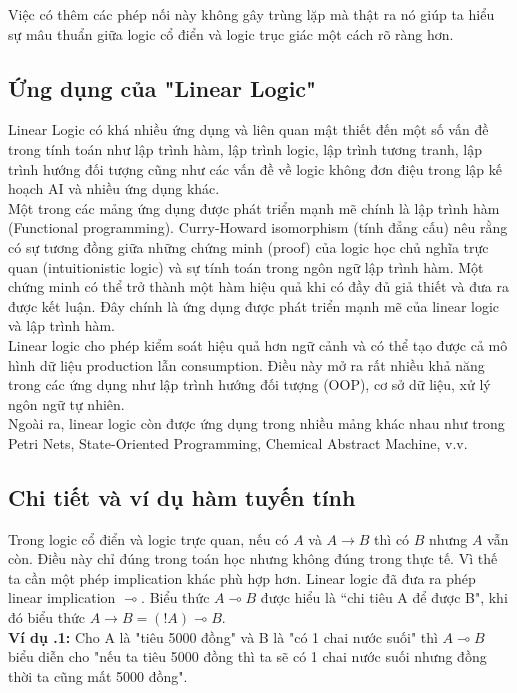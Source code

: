 \documentclass[a4paper]{article}
\begin{document}
Việc có thêm các phép nối này không gây trùng lặp mà thật ra nó giúp ta hiểu sự mâu thuẩn giữa logic cổ điển và logic trục giác một cách rõ ràng hơn.

\subsection{Ứng dụng của "Linear Logic"}
Linear Logic có khá nhiều ứng dụng và liên quan mật thiết đến một số vấn đề trong tính toán như lập trình hàm, lập trình logic, lập trình tương tranh, lập trình hướng đối tượng cũng như các vấn đề về logic không đơn điệu trong lập kế hoạch AI và nhiều ứng dụng khác.\\

Một trong các mảng ứng dụng được phát triển mạnh mẽ chính là lập trình hàm (Functional programming). Curry-Howard isomorphism (tính đẳng cấu) nêu rằng có sự tương đồng giữa những chứng minh (proof) của logic học chủ nghĩa trực quan (intuitionistic logic) và sự tính toán trong ngôn ngữ lập trình hàm. Một chứng minh có thể trở thành một hàm hiệu quả khi có đầy đủ giả thiết và đưa ra được kết luận. Đây chính là ứng dụng được phát triển mạnh mẽ của linear logic và lập trình hàm.\\

Linear logic cho phép kiểm soát hiệu quả hơn ngữ cảnh và có thể tạo được cả mô hình dữ liệu production lẫn consumption. Điều này mở ra rất nhiều khả năng trong các ứng dụng như lập trình hướng đối tượng (OOP), cơ sở dữ liệu, xử lý ngôn ngữ tự nhiên.\\

Ngoài ra, linear logic còn được ứng dụng trong nhiều mảng khác nhau như trong Petri Nets, State-Oriented Programming, Chemical Abstract Machine, v.v.

\subsection{Chi tiết và ví dụ hàm tuyến tính}
Trong logic cổ điển và logic trực quan, nếu có $A$ và $A \rightarrow  B$ thì có $B$ nhưng $A$ vẫn còn. Điều này chỉ đúng trong toán học nhưng không đúng trong thực tế. Vì thế ta cần một phép implication khác phù hợp hơn. Linear logic đã đưa ra phép linear implication $\multimap$. Biểu thức $A \multimap B$ được hiểu là “chi tiêu A để được B", khi đó biểu thức $A \rightarrow B = (!A) \multimap B$.\\

\textbf{Ví dụ \thesubsection.1:} Cho A là "tiêu 5000 đồng" và B là "có 1 chai nước suối" thì $A \multimap B$ biểu diễn cho "nếu ta tiêu 5000 đồng thì ta sẽ có 1 chai nước suối nhưng đồng thời ta cũng mất 5000 đồng".
\end{document}
